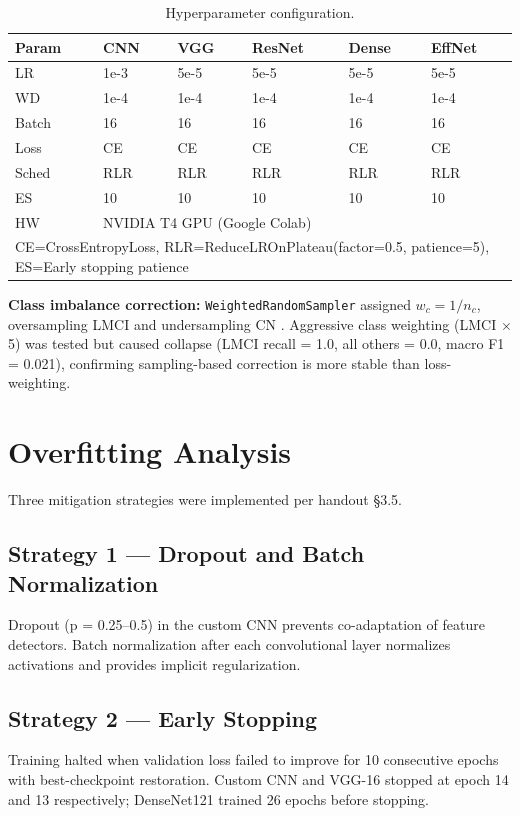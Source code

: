 \documentclass[12pt, a4paper]{article}
\begin{document}
\begin{table}[H]
\centering
\caption{Hyperparameter configuration.}
\label{tab:hyperparams}
\begin{tabular}{llllll}
\toprule
\textbf{Param} & \textbf{CNN} & \textbf{VGG}
    & \textbf{ResNet} & \textbf{Dense} & \textbf{EffNet}\\
\midrule
LR    & 1e-3 & 5e-5 & 5e-5 & 5e-5 & 5e-5\\
WD    & 1e-4 & 1e-4 & 1e-4 & 1e-4 & 1e-4\\
Batch & 16 & 16 & 16 & 16 & 16\\
Loss  & CE & CE & CE & CE & CE\\
Sched & RLR & RLR & RLR & RLR & RLR\\
ES    & 10 & 10 & 10 & 10 & 10\\
HW    & \multicolumn{5}{l}{NVIDIA T4 GPU (Google Colab)}\\
\bottomrule
\multicolumn{6}{l}{\small CE=CrossEntropyLoss,
RLR=ReduceLROnPlateau(factor=0.5, patience=5),
ES=Early stopping patience}\\
\end{tabular}
\end{table}

\textbf{Class imbalance correction:}
\texttt{WeightedRandomSampler} assigned $w_c = 1/n_c$,
oversampling LMCI and undersampling CN
\cite{johnson2019}. Aggressive class weighting
(LMCI $\times$5) was tested but caused collapse (LMCI
recall = 1.0, all others = 0.0, macro F1 = 0.021),
confirming sampling-based correction is more stable
than loss-weighting.

\section{Overfitting Analysis}

Three mitigation strategies were implemented per
handout \S3.5.

\subsection{Strategy 1 --- Dropout and Batch Normalization}
Dropout (p = 0.25--0.5) in the custom CNN prevents
co-adaptation of feature detectors. Batch normalization
after each convolutional layer normalizes activations
and provides implicit regularization.

\subsection{Strategy 2 --- Early Stopping}
Training halted when validation loss failed to improve
for 10 consecutive epochs with best-checkpoint
restoration. Custom CNN and VGG-16 stopped at epoch 14
and 13 respectively; DenseNet121 trained 26 epochs
before stopping.
\end{document}
